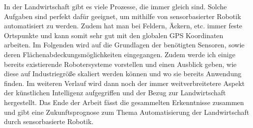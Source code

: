 In der Landwirtschaft gibt es viele Prozesse, die immer gleich sind. Solche
Aufgaben sind perfekt dafür geeignet, um mithilfe von sensorbasierter Robotik
automatisiert zu werden. Zudem hat man bei Feldern, Äckern, etc. immer feste
Ortspunkte und kann somit sehr gut mit den globalen GPS Koordinaten arbeiten.
Im Folgenden wird auf die Grundlagen der benötigten Sensoren, sowie deren
Flächenabdeckungsmöglichkeiten eingegangen. Zudem werde ich einige bereits
existierende Robotersysteme vorstellen und einen Ausblick geben, wie diese auf
Industriegröße skaliert werden können und wo sie bereits Anwendung finden. Im
weiteren Verlauf wird dann noch der immer weitverbreitetere Aspekt der
künstlichen Intelligenz aufgegriffen und der Bezug zur Landwirtschaft
hergestellt. Das Ende der Arbeit fässt die gesammelten Erkenntnisse zusammen
und gibt eine Zukunftsprognose zum Thema Automatisierung der Landwirtschaft
durch sensorbasierte Robotik.